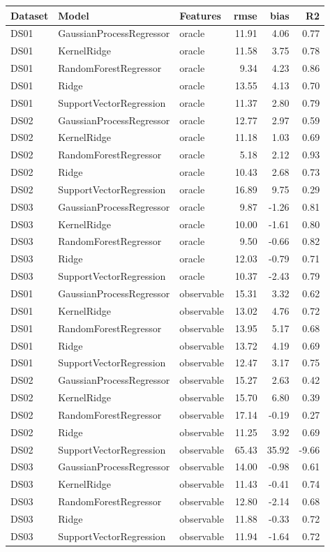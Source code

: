 \begin{tabular}{lllrrr}
\toprule
Dataset & Model & Features & rmse & bias & R2 \\
\midrule
DS01 & GaussianProcessRegressor & oracle & 11.91 & 4.06 & 0.77 \\
DS01 & KernelRidge & oracle & 11.58 & 3.75 & 0.78 \\
DS01 & RandomForestRegressor & oracle & 9.34 & 4.23 & 0.86 \\
DS01 & Ridge & oracle & 13.55 & 4.13 & 0.70 \\
DS01 & SupportVectorRegression & oracle & 11.37 & 2.80 & 0.79 \\
DS02 & GaussianProcessRegressor & oracle & 12.77 & 2.97 & 0.59 \\
DS02 & KernelRidge & oracle & 11.18 & 1.03 & 0.69 \\
DS02 & RandomForestRegressor & oracle & 5.18 & 2.12 & 0.93 \\
DS02 & Ridge & oracle & 10.43 & 2.68 & 0.73 \\
DS02 & SupportVectorRegression & oracle & 16.89 & 9.75 & 0.29 \\
DS03 & GaussianProcessRegressor & oracle & 9.87 & -1.26 & 0.81 \\
DS03 & KernelRidge & oracle & 10.00 & -1.61 & 0.80 \\
DS03 & RandomForestRegressor & oracle & 9.50 & -0.66 & 0.82 \\
DS03 & Ridge & oracle & 12.03 & -0.79 & 0.71 \\
DS03 & SupportVectorRegression & oracle & 10.37 & -2.43 & 0.79 \\
DS01 & GaussianProcessRegressor & observable & 15.31 & 3.32 & 0.62 \\
DS01 & KernelRidge & observable & 13.02 & 4.76 & 0.72 \\
DS01 & RandomForestRegressor & observable & 13.95 & 5.17 & 0.68 \\
DS01 & Ridge & observable & 13.72 & 4.19 & 0.69 \\
DS01 & SupportVectorRegression & observable & 12.47 & 3.17 & 0.75 \\
DS02 & GaussianProcessRegressor & observable & 15.27 & 2.63 & 0.42 \\
DS02 & KernelRidge & observable & 15.70 & 6.80 & 0.39 \\
DS02 & RandomForestRegressor & observable & 17.14 & -0.19 & 0.27 \\
DS02 & Ridge & observable & 11.25 & 3.92 & 0.69 \\
DS02 & SupportVectorRegression & observable & 65.43 & 35.92 & -9.66 \\
DS03 & GaussianProcessRegressor & observable & 14.00 & -0.98 & 0.61 \\
DS03 & KernelRidge & observable & 11.43 & -0.41 & 0.74 \\
DS03 & RandomForestRegressor & observable & 12.80 & -2.14 & 0.68 \\
DS03 & Ridge & observable & 11.88 & -0.33 & 0.72 \\
DS03 & SupportVectorRegression & observable & 11.94 & -1.64 & 0.72 \\
\bottomrule
\end{tabular}
